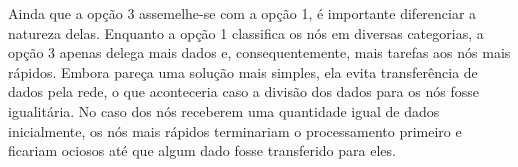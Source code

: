 Ainda que a opção 3 assemelhe-se com a opção 1, é importante diferenciar a natureza delas. Enquanto a opção 1 classifica os nós em diversas categorias, a opção 3 apenas delega mais dados e, consequentemente, mais tarefas aos nós mais rápidos. Embora pareça uma solução mais simples, ela evita transferência de dados pela rede, o que aconteceria caso a divisão dos dados para os nós fosse igualitária. No caso dos nós receberem uma quantidade igual de dados inicialmente, os nós mais rápidos terminariam o processamento primeiro e ficariam ociosos até que algum dado fosse transferido para eles.
%
%
%		
%
